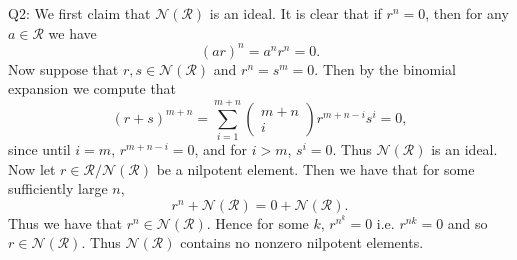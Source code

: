 \documentclass[letterpaper]{article}
\newcommand{\ring}{\mathcal{R}}
\begin{document}
 
\noindent
Q2: We first claim that $\mathcal{N}(\mathcal{R})$ is an ideal. It is clear that if $r^n=0$, then for any $a\in \ring$ we have $$(ar)^n = a^n r^n = 0.$$
Now suppose that $r,s \in \mathcal{N}(\ring)$ and $r^n=s^m=0.$ Then by the binomial expansion we compute that $$(r+s)^{m+n} = \sum_{i=1}^{m+n} \begin{pmatrix}
    m+n \\ i
\end{pmatrix} r^{m+n-i}s^{i} = 0,$$ since until $i=m$, $r^{m+n-i}=0$, and for $i >m$, $s^i=0$. Thus $\mathcal{N}(\ring)$ is an ideal. Now let $r\in \ring/ \mathcal{N}(\ring)$ be a nilpotent element. Then we have that for some sufficiently large $n$, $$ r^n + \mathcal{N}(\ring) = 0+ \mathcal{N}(\ring).$$ Thus we have that $r^n \in \mathcal{N}(\ring).$ Hence for some $k$, $r^{n^{k}} = 0$ i.e. $r^{nk}=0$ and so $r\in \mathcal{N}(\ring).$ Thus $\mathcal{N}(\ring)$ contains no nonzero nilpotent elements.
\end{document}
